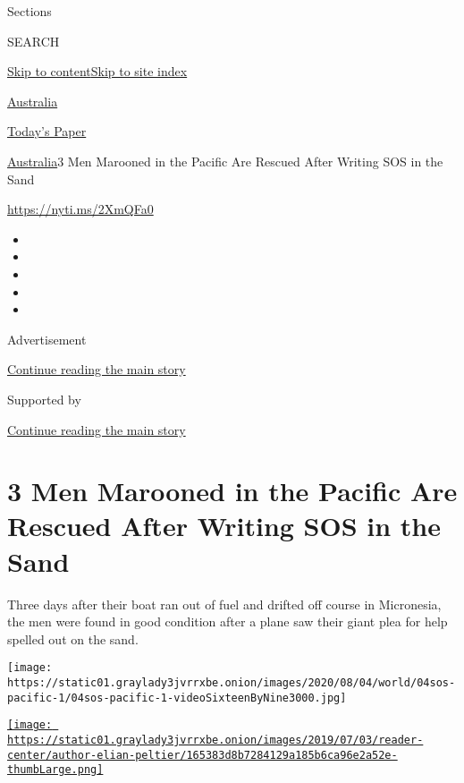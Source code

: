 Sections

SEARCH

\protect\hyperlink{site-content}{Skip to
content}\protect\hyperlink{site-index}{Skip to site index}

\href{https://www.nytimes3xbfgragh.onion/section/world/australia}{Australia}

\href{https://myaccount.nytimes3xbfgragh.onion/auth/login?response_type=cookie\&client_id=vi}{}

\href{https://www.nytimes3xbfgragh.onion/section/todayspaper}{Today's
Paper}

\href{/section/world/australia}{Australia}\textbar{}3 Men Marooned in
the Pacific Are Rescued After Writing SOS in the Sand

\href{https://nyti.ms/2XmQFa0}{https://nyti.ms/2XmQFa0}

\begin{itemize}
\item
\item
\item
\item
\item
\end{itemize}

Advertisement

\protect\hyperlink{after-top}{Continue reading the main story}

Supported by

\protect\hyperlink{after-sponsor}{Continue reading the main story}

\hypertarget{3-men-marooned-in-the-pacific-are-rescued-after-writing-sos-in-the-sand}{%
\section{3 Men Marooned in the Pacific Are Rescued After Writing SOS in
the
Sand}\label{3-men-marooned-in-the-pacific-are-rescued-after-writing-sos-in-the-sand}}

Three days after their boat ran out of fuel and drifted off course in
Micronesia, the men were found in good condition after a plane saw their
giant plea for help spelled out on the sand.

\texttt{[image: https://static01.graylady3jvrrxbe.onion/images/2020/08/04/world/04sos-pacific-1/04sos-pacific-1-videoSixteenByNine3000.jpg]}

\href{https://www.nytimes3xbfgragh.onion/by/elian-peltier}{\texttt{[image: https://static01.graylady3jvrrxbe.onion/images/2019/07/03/reader-center/author-elian-peltier/165383d8b7284129a185b6ca96e2a52e-thumbLarge.png]}}

